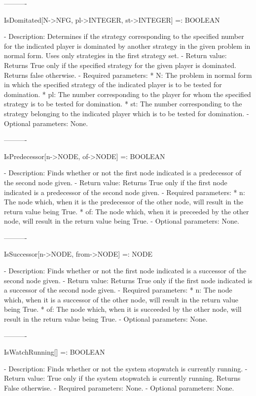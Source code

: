 ----------

IsDomitated[N->NFG, pl->INTEGER, st->INTEGER] =: BOOLEAN

   -	Description:  Determines if the strategy corresponding to the specified
	number for the indicated player is dominated by another strategy in the
	given problem in normal form.  Uses only strategies in the first 
	strategy set.
   -	Return value:  Returns True only if the specified strategy for the 
	given player is dominated.  Returns false otherwise.
   -	Required parameters:
	  *  N:  The problem in normal form in which the specified strategy of
		the indicated player is to be tested for domination.
	  *  pl:  The number corresponding to the player for whom the specified
		strategy is to be tested for domination.
	  *  st:  The number corresponding to the strategy belonging to the 
		indicated player which is to be tested for domination.
   -	Optional parameters:  None.

----------

IsPredecessor[n->NODE, of->NODE] =: BOOLEAN

   -	Description:  Finds whether or not the first node indicated is a 
	predecessor of the second node given.
   -	Return value:  Returns True only if the first node indicated is a
	predecessor of the second node given.
   -	Required parameters:
	  *  n:  The node which, when it is the predecessor of the other node,
		will result in the return value being True.
	  *  of:  The node which, when it is preceeded by the other node, will
		result in the return value being True.
   -	Optional parameters:  None.

----------

IsSuccessor[n->NODE, from->NODE] =: NODE

   -	Description:  Finds whether or not the first node indicated is a 
	successor of the second node given.
   -	Return value:  Returns True only if the first node indicated is a
	successor of the second node given.
   -	Required parameters:
	  *  n:  The node which, when it is a successor of the other node, will
		result in the return value being True.
	  *  of:  The node which, when it is succeeded by the other node, will
		result in the return value being True.
   -	Optional parameters:  None.

----------

IsWatchRunning[] =: BOOLEAN

   -	Description:  Finds whether or not the system stopwatch is currently
	running.
   -	Return value:  True only if the system stopwatch is currently running.
	Returns False otherwise.
   -	Required parameters:  None.
   -	Optional parameters:  None.

